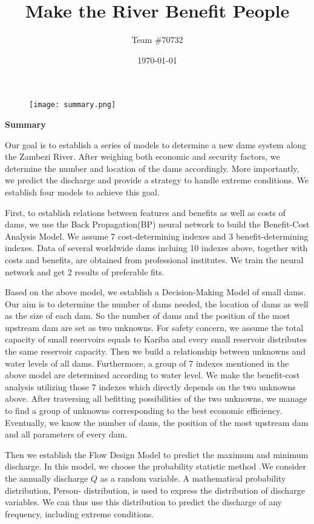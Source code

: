 \documentclass[12pt]{article}%
\title{Make the River Benefit People}
\author{Team \#70732}
\date{\today}
\begin{document}
\begin{figure}[H]
	\centering
	\texttt{[image: summary.png]}
	\label{Summary}
\end{figure}
\begin{center}
\textbf{Summary}
\end{center}
Our goal is to establish a series of models to determine a new dams system along the Zambezi River. After weighing both economic and security factors, we determine the number and location of the dams accordingly. More importantly, we predict the discharge and provide a strategy to handle extreme conditions. We establish four models to achieve this goal.
\par\noindent
\par\noindent
First, to establish relations between features and benefits as well as costs of dams, we use the Back Propagation(BP) neural network to build the Benefit-Cost Analysis Model. We assume 7 cost-determining indexes and 3 benefit-determining indexes. Data of several worldwide dams incluing 10 indexes above, together with costs and benefits, are obtained from professional institutes. We train the neural network and get 2 results of preferable fits.
\par\noindent
\par\noindent
Based on the above model, we establish a Decision-Making Model of small dams. Our aim is to determine the number of dams needed, the location of dams as well as the size of each dam. So the number of dams and the position of the most upstream dam are set as two unknowns. For safety concern, we assume the total capacity of small reservoirs equals to Kariba and every small reservoir distributes the same reservoir capacity. Then we build a relationship between unknowns and water levels of all dams. Furthermore, a group of 7 indexes mentioned in the above model are determined according to water level. We make the benefit-cost analysis utilizing those 7 indexes which directly depends on the two unknowns above. After traversing all befitting possibilities of the two unknowns, we manage to find a group of unknowns corresponding to the best economic efficiency. Eventually, we know the number of dams, the position of the most upstream dam and all parameters of every dam.
\par\noindent
\par\noindent
Then we establish the Flow Design Model to predict the maximum and minimum discharge. In this model, we choose the probability statistic method .We consider the annually discharge $Q$ as a random variable. A mathematical probability distribution, Person-\uppercase\expandafter{} distribution, is used to express the distribution of discharge variables. We can thus use this distribution to predict the discharge of any frequency, including extreme conditions.
\end{document}
